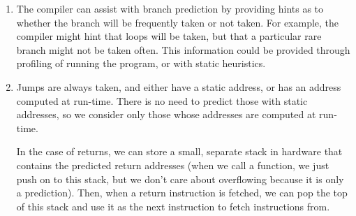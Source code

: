 \begin{enumerate}[label=(\alph*)]
  \item
    The compiler can assist with branch prediction by providing hints as to whether the branch will be frequently taken or not taken. For example, the compiler might hint that loops will be taken, but that a particular rare branch might not be taken often. This information could be provided through profiling of running the program, or with static heuristics.

  \item
    Jumps are always taken, and either have a static address, or has an address computed at run-time. There is no need to predict those with static addresses, so we consider only those whose addresses are computed at run-time.

    In the case of returns, we can store a small, separate stack in hardware that contains the predicted return addresses (when we call a function, we just push on to this stack, but we don't care about overflowing because it is only a prediction). Then, when a return instruction is fetched, we can pop the top of this stack and use it as the next instruction to fetch instructions from.
    
\end{enumerate}

